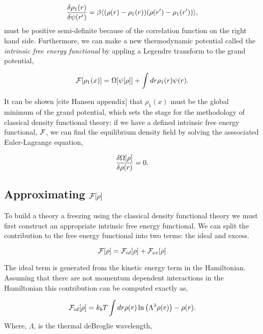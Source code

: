 \begin{equation}
    \frac{\delta \rho_1(r)}{\delta \psi(r^\prime)} = \beta \langle (\rho(r) - \rho_1(r))(\rho(r^\prime) - \rho_1(r^\prime)) \rangle, 
\end{equation}
must be positive semi-definite because of the correlation function on the right hand side. Furthermore, we can make a new thermodynamic potential called the \textit{intrinsic free energy functional} by appling a Legendre transform to the grand potential,

\begin{equation}
    \mathcal{F}[\rho_1(x)] = \Omega[\psi[\rho]] + \int dr \rho_1(r) \psi(r).
\end{equation}

It can be shown [cite Hansen appendix] that $\rho_1(x)$ must be the global minimum of the grand potential, which sets the stage for the methodology of classical density functional theory: if we have a defined intrinsic free energy functional, $\mathcal{F}$, we can find the equilibrium density field by solving the asssociated Euler-Lagrange equation, 

\begin{equation}
    \frac{\delta \Omega[\rho]}{\delta \rho(r)} = 0.
\end{equation}

\subsection{Approximating $\mathcal{F}[\rho]$}

To build a theory a freezing using the classical density functional theory we must first construct an appropriate intrinsic free energy functional. We can split the contribution to the free energy functional into two terms: the ideal and excess. 

\begin{equation}
    \mathcal{F}[\rho] = \mathcal{F}_{id}[\rho] + \mathcal{F}_{ex}[\rho]
\end{equation}

The ideal term is generated from the kinetic energy term in the Hamiltonian. Assuming that there are not momentum dependent interactions in the Hamiltonian this contribution can be computed exactly as, 

\begin{equation}
\mathcal{F}_{id}[\rho] = k_bT \int dr \rho(r) \ln\left(\Lambda^3\rho(r)\right) - \rho(r).
\end{equation}
Where, $\Lambda$, is the thermal deBroglie wavelength, 

